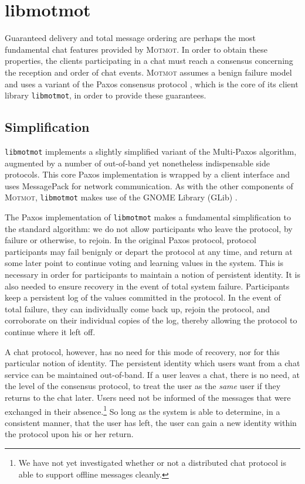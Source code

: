 \documentclass{sig-alternate}
\newcommand\Motmot{\textsc{Motmot}\xspace}
\newcommand\libmotmot{\texttt{libmotmot}\xspace}
\begin{document}
\section{libmotmot}

Guaranteed delivery and total message ordering are perhaps the most fundamental
chat features provided by \Motmot.  In order to obtain these properties, the
clients participating in a chat must reach a consensus concerning the reception
and order of chat events.  \Motmot assumes a benign failure model and uses a
variant of the Paxos consensus protocol \cite{paxos,paxsimp}, which is the core
of its client library \libmotmot, in order to provide these guarantees.

\subsection{Simplification}

\libmotmot implements a slightly simplified variant of the Multi-Paxos
algorithm, augmented by a number of out-of-band yet nonetheless indispensable
side protocols.  This core Paxos implementation is wrapped by a client
interface and uses MessagePack \cite{msgpack} for network communication.
As with the other components of \Motmot, \libmotmot makes use of the GNOME
Library (GLib) \cite{glib}.

The Paxos implementation of \libmotmot makes a fundamental simplification to
the standard algorithm: we do not allow participants who leave the protocol, by
failure or otherwise, to rejoin.  In the original Paxos protocol, protocol
participants may fail benignly or depart the protocol at any time, and return
at some later point to continue voting and learning values in the system.
This is necessary in order for participants to maintain a notion of persistent
identity.  It is also needed to ensure recovery in the event of total system
failure.  Participants keep a persistent log of the values committed in the
protocol.  In the event of total failure, they can individually come back up,
rejoin the protocol, and corroborate on their individual copies of the log,
thereby allowing the protocol to continue where it left off.

A chat protocol, however, has no need for this mode of recovery, nor for this
particular notion of identity.  The persistent identity which users want from
a chat service can be maintained out-of-band.  If a user leaves a chat, there
is no need, at the level of the consensus protocol, to treat the user as the
\emph{same} user if they returns to the chat later.  Users need not be informed
of the messages that were exchanged in their absence.\footnote{We have not yet
investigated whether or not a distributed chat protocol is able to support
offline messages cleanly.}  So long as the system is able to determine, in a
consistent manner, that the user has left, the user can gain a new identity
within the protocol upon his or her return.
\end{document}
